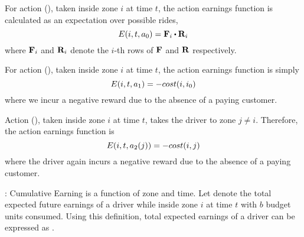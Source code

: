 \squishlist
	\item For action {\getpassengeraction} ({\getpassenger}), taken inside zone $i$ at time $t$, the action earnings function
	is calculated as an expectation over possible rides,
	\begin{equation}\label{eq:a0}
	\actionearning{i}{t}{a_0} = \empiricaltransitionmatrix_{i}\bigcdot \rewardsmatrix_{i}
	\end{equation}
	where ${\mathbf{F}}_{i}$ and ${\mathbf{R}}_{i}$ denote the $i$-th rows of ${\mathbf{F}}$ and ${\mathbf{R}}$ respectively. 
	
	\item For action {\gohomeaction} ({\gohome}), taken inside zone $i$ at time $t$, the action earnings function is simply
	\begin{equation}\label{eq:a1}
	E({i},{t},{a_1}) = - cost(i,{i_0})
	\end{equation}
	where we incur a negative reward due to the absence of a paying customer. 

	\item Action {\relocateaction} ({\relocate}), taken inside zone $i$ at time $t$, 
	takes the driver to zone $j \neq i$. Therefore, the action earnings function is 
	\begin{equation}\label{eq:a2}
	E({i},{t},{a_2(j)}) = - cost(i,j)
	\end{equation}
	where the driver again incurs a negative reward due to the absence of a paying customer. 
\squishend

\iffalse
{}:
Cumulative Earning is a function of zone and time. Let {} denote the total expected future earnings of a driver
while inside zone $i$ at time $t$ with $b$ budget units consumed. Using this definition, total expected earnings of a driver can be expressed
as {}.

